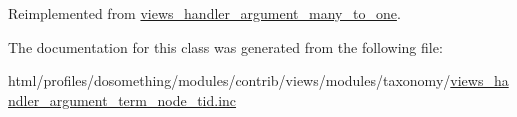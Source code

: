 Reimplemented from \hyperlink{classviews__handler__argument__many__to__one_a0b758f84ee6b9a473313ec92714b06c7}{views\_\-handler\_\-argument\_\-many\_\-to\_\-one}.

The documentation for this class was generated from the following file:\begin{DoxyCompactItemize}
\item 
html/profiles/dosomething/modules/contrib/views/modules/taxonomy/\hyperlink{views__handler__argument__term__node__tid_8inc}{views\_\-handler\_\-argument\_\-term\_\-node\_\-tid.inc}\end{DoxyCompactItemize}
